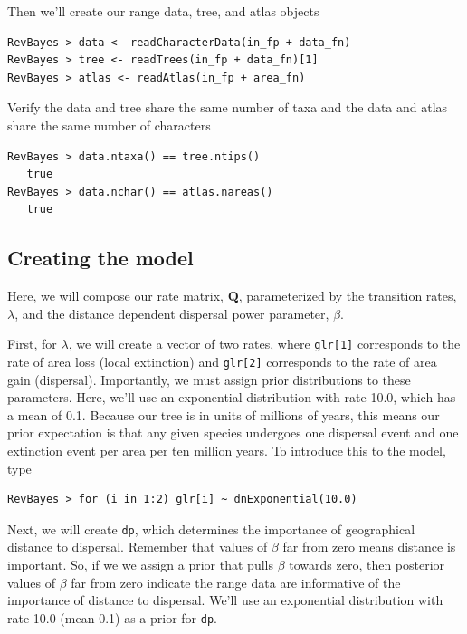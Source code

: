 \documentclass[11pt]{article}
\begin{document}
Then we'll create our range data, tree, and atlas objects

\begin{snugshade}
\begin{lstlisting}
RevBayes > data <- readCharacterData(in_fp + data_fn)
RevBayes > tree <- readTrees(in_fp + data_fn)[1]
RevBayes > atlas <- readAtlas(in_fp + area_fn)
\end{lstlisting}
\end{snugshade}

Verify the data and tree share the same number of taxa and the data and atlas share the same number of characters

\begin{snugshade}
\begin{lstlisting}
RevBayes > data.ntaxa() == tree.ntips()
   true
RevBayes > data.nchar() == atlas.nareas()
   true
\end{lstlisting}
\end{snugshade}


\subsection{Creating the model}

Here, we will compose our rate matrix, {\bf Q}, parameterized by the transition rates, $\lambda$, and the distance dependent dispersal power parameter, $\beta$.

First, for $\lambda$, we will create a vector of two rates, where {\tt glr[1]} corresponds to the rate of area loss (local extinction) and {\tt glr[2]} corresponds to the rate of area gain (dispersal).
Importantly, we must assign prior distributions to these parameters.
Here, we'll use an exponential distribution with rate 10.0, which has a mean of 0.1.
Because our tree is in units of millions of years, this means our prior expectation is that any given species undergoes one dispersal event and one extinction event per area per ten million years.
To introduce this to the model, type
\begin{snugshade}
\begin{lstlisting}
RevBayes > for (i in 1:2) glr[i] ~ dnExponential(10.0)
\end{lstlisting}
\end{snugshade}

Next, we will create {\tt dp}, which determines the importance of geographical distance to dispersal.
Remember that values of $\beta$ far from zero means distance is important.
So, if we we assign a prior that pulls $\beta$ towards zero, then posterior values of $\beta$ far from zero indicate the range data are informative of the importance of distance to dispersal.
We'll use an exponential distribution with rate 10.0 (mean 0.1) as a prior for {\tt dp}.
\end{document}
